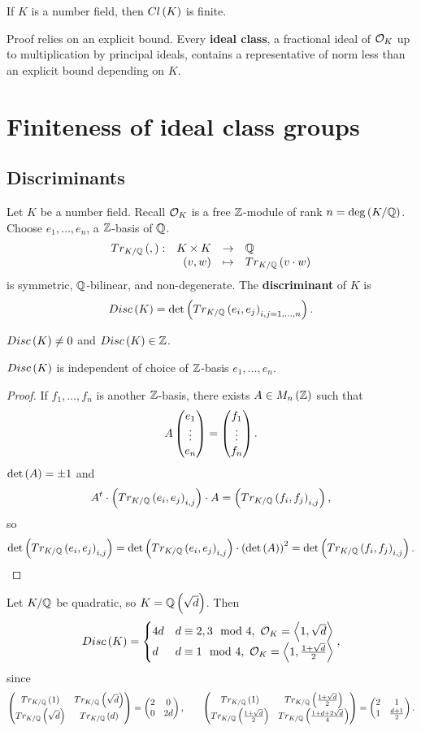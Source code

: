 \begin{theorem}
If $ K $ is a number field, then $ Cl\left( K \right) $ is finite.
\end{theorem}

Proof relies on an explicit bound. Every \textbf{ideal class}, a fractional ideal of $ \mathcal{O}_K $ up to multiplication by principal ideals, contains a representative of norm less than an explicit bound depending on $ K $.

\pagebreak

\section{Finiteness of ideal class groups}

\subsection{Discriminants}

Let $ K $ be a number field. Recall $ \mathcal{O}_K $ is a free $ \mathbb{Z} $-module of rank $ n = \deg\left( K / \mathbb{Q} \right) $. Choose $ e_1, \dots, e_n $, a $ \mathbb{Z} $-basis of $ \mathbb{Q} $.
$$ \function[Tr_{K / \Q}\rb{,}]{K \times K}{\Q}{\rb{v, w}}{Tr_{K / \Q}\rb{v \cdot w}} $$
is symmetric, $ \mathbb{Q} $-bilinear, and non-degenerate. The \textbf{discriminant} of $ K $ is
$$ Disc\left( K \right) = \det\left( Tr_{K / \mathbb{Q}}\left( e_i, e_j \right)_{i, j = 1, \dots, n} \right). $$

\begin{remark*}
$ Disc\left( K \right) \ne 0 $ and $ Disc\left( K \right) \in \mathbb{Z} $.
\end{remark*}

\begin{lemma}
$ Disc\left( K \right) $ is independent of choice of $ \mathbb{Z} $-basis $ e_1, \dots, e_n $.
\end{lemma}

\begin{proof}
If $ f_1, \dots, f_n $ is another $ \mathbb{Z} $-basis, there exists $ A \in M_n\left( \mathbb{Z} \right) $ such that
$$ A\begin{pmatrix} e_1 \\ \vdots \\ e_n \end{pmatrix} = \begin{pmatrix} f_1 \\ \vdots \\ f_n \end{pmatrix}. $$
$ \det\left( A \right) = \pm 1 $ and
$$ A^t \cdot \left( Tr_{K / \mathbb{Q}}\left( e_i, e_j \right)_{i, j} \right) \cdot A = \left( Tr_{K / \mathbb{Q}}\left( f_i, f_j \right)_{i, j} \right), $$
so
$$ \det\left( Tr_{K / \mathbb{Q}}\left( e_i, e_j \right)_{i, j} \right) = \det\left( Tr_{K / \mathbb{Q}}\left( e_i, e_j \right)_{i, j} \right) \cdot \left( \det\left( A \right) \right)^2 = \det\left( Tr_{K / \mathbb{Q}}\left( f_i, f_j \right)_{i, j} \right). $$
\end{proof}

\begin{example*}
Let $ K / \mathbb{Q} $ be quadratic, so $ K = \mathbb{Q}\left( \sqrt{d} \right) $. Then
$$ Disc\left( K \right) =
\begin{cases}
4d & d \equiv 2, 3 \mod 4, \ \mathcal{O}_K = \left\langle 1, \sqrt{d} \right\rangle \\
d & d \equiv 1 \mod 4, \ \mathcal{O}_K = \left\langle 1, \tfrac{1 + \sqrt{d}}{2} \right\rangle
\end{cases},
$$
since
$$ \begin{pmatrix} Tr_{K / \mathbb{Q}}\left( 1 \right) & Tr_{K / \mathbb{Q}}\left( \sqrt{d} \right) \\ Tr_{K / \mathbb{Q}}\left( \sqrt{d} \right) & Tr_{K / \mathbb{Q}}\left( d \right) \end{pmatrix} = \begin{pmatrix} 2 & 0 \\ 0 & 2d \end{pmatrix}, \qquad \begin{pmatrix} Tr_{K / \mathbb{Q}}\left( 1 \right) & Tr_{K / \mathbb{Q}}\left( \tfrac{1 + \sqrt{d}}{2} \right) \\ Tr_{K / \mathbb{Q}}\left( \tfrac{1 + \sqrt{d}}{2} \right) & Tr_{K / \mathbb{Q}}\left( \tfrac{1 + d + 2\sqrt{d}}{4} \right) \end{pmatrix} = \begin{pmatrix} 2 & 1 \\ 1 & \tfrac{d + 1}{2} \end{pmatrix}. $$
\end{example*}

